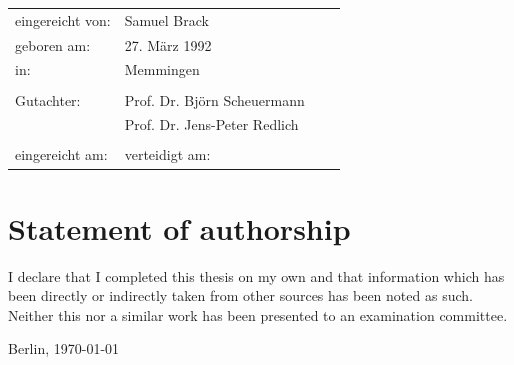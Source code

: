 \documentclass[a4paper,
		12pt,
		parskip=full,
		titlepage
		]{scrartcl}
\begin{document}
{\large
  \begin{tabular}{llll}
    eingereicht von:    &Samuel Brack  && \\ %
    geboren am:         &27. März 1992  && \\
    in:                 &Memmingen  && \\
    &&&\\
    Gutachter: &Prof. Dr. Björn Scheuermann  && \\
              &Prof. Dr. Jens-Peter Redlich  && \\%
    &&&\\
    eingereicht am:     &   \hspace{3cm} verteidigt am: &  \\ %
  \end{tabular}
}

\newpage


\chapter{Statement of authorship}

\thispagestyle{empty}


{\parindent 0cm
 
I declare that I completed this thesis on my own and that information which has been
directly or indirectly taken from other sources has been noted as such. Neither this
nor a similar work has been presented to an examination committee.

  \vspace{3\baselineskip}
 
  Berlin, \today \hspace{0.25\linewidth}\parbox{0.3\linewidth}{\dotfill}
}
\newpage
\end{document}
